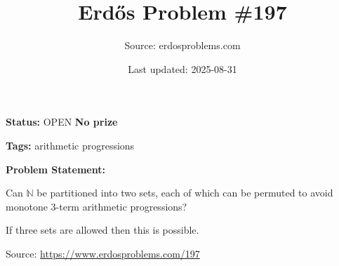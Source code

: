 \documentclass{article}
\title{Erd\H{o}s Problem \#197}
\date{Last updated: 2025-08-31}
\author{Source: erdosproblems.com}
\begin{document}
\maketitle

\noindent\textbf{Status:} OPEN \quad \textbf{No prize}

\noindent\textbf{Tags:} arithmetic progressions

\medskip

\noindent\textbf{Problem Statement:}

Can $\mathbb{N}$ be partitioned into two sets, each of which can be permuted to avoid monotone 3-term arithmetic progressions?




If three sets are allowed then this is possible.


\bigskip
\noindent\small{Source: \url{https://www.erdosproblems.com/197}}
\end{document}

